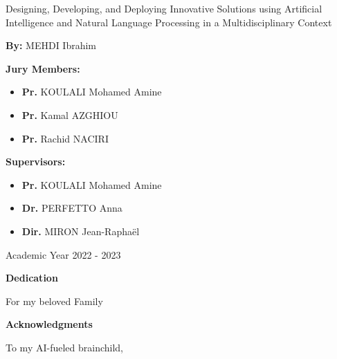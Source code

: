 \documentclass[a4paper,12pt,twoside]{report}
\begin{document}
\begin{titlepage}
\begin{center}
    \hrulefill\par
    \LARGE Designing, Developing, and Deploying Innovative Solutions using Artificial Intelligence and Natural Language Processing in a Multidisciplinary Context\par
    \hrulefill\par
\end{center}
\vfill

\begin{center}
\textbf{By:}
    MEHDI Ibrahim

\end{center}

\vfill


\begin{multicols}{2}
\noindent \textbf{Jury Members:}
\begin{itemize}[label=\textbullet, leftmargin=*]
  \item \textbf{Pr.} KOULALI Mohamed Amine
    \item \textbf{Pr.} Kamal AZGHIOU
      \item \textbf{Pr.} Rachid NACIRI 
\end{itemize}

\columnbreak

\noindent \textbf{Supervisors:}
\begin{itemize}[label=\textbullet, leftmargin=*]
  \item \textbf{Pr.} KOULALI Mohamed Amine
  \item \textbf{Dr.} PERFETTO Anna
  \item \textbf{Dir.} MIRON Jean-Raphaël
\end{itemize}

\end{multicols}

\begin{center}
    Academic Year 2022 - 2023
\end{center}

\end{titlepage}

\newpage

\begin{center}
    \Large{\textbf{Dedication}}
\end{center}


\begin{center}
    \Large{For my beloved Family}
\end{center}
\newpage
\thispagestyle{empty}
\begin{center}
    \Large\textbf{Acknowledgments}
\end{center}
To my AI-fueled brainchild,
\end{document}

